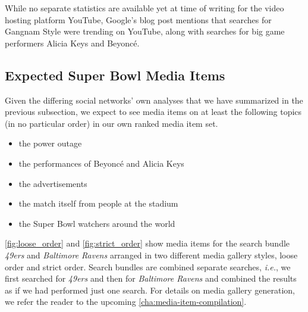 While no separate statistics are available yet at time of writing
for the video hosting platform YouTube,
Google's blog post mentions that searches for Gangnam Style were trending on YouTube,
along with searches for big game performers Alicia Keys and Beyoncé.

\subsection{Expected Super Bowl Media Items}

Given the differing social networks' own analyses
that we have summarized in the previous subsection,
we expect to see media items
on at least the following topics (in no particular order)
in our own ranked media item set.

\begin{itemize}
  \itemsep0em
  \item the power outage
  \item the performances of Beyoncé and Alicia Keys
  \item the advertisements
  \item the match itself from people at the stadium
  \item the Super Bowl watchers around the world 
\end{itemize}

\autoref{fig:loose_order} and \autoref{fig:strict_order} show media items
for the search bundle \emph{49ers} and \emph{Baltimore Ravens} arranged
in two different media gallery styles, loose order and strict order.
Search bundles are combined separate searches, \emph{i.e.},
we first searched for \emph{49ers} and then for \emph{Baltimore Ravens}
and combined the results as if we had performed just one search.
For details on media gallery generation, we refer the reader to the upcoming
\autoref{cha:media-item-compilation}.

